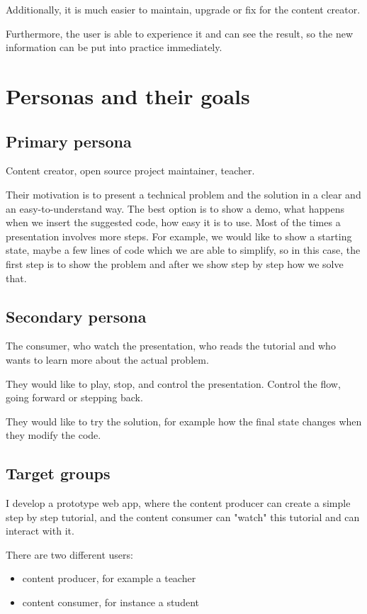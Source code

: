 \documentclass[12pt, a4paper, oneside, openright, medskipamount]{report}
\begin{document}
Additionally, it is much easier to maintain, upgrade or fix for the content creator.

Furthermore, the user is able to experience it and can see the result, so the new information can be put into practice immediately.

\section{Personas and their goals}

\subsection{Primary persona}

Content creator, open source project maintainer, teacher.

Their motivation is to present a technical problem and the solution in a clear and an easy-to-understand way. The best option is to show a demo, what happens when we insert the suggested code, how easy it is to use. Most of the times a presentation involves more steps. For example, we would like to show a starting state, maybe a few lines of code which we are able to simplify, so in this case, the first step is to show the problem and after we show step by step how we solve that.

\subsection{Secondary persona}

The consumer, who watch the presentation, who reads the tutorial and who wants to learn more about the actual problem.

They would like to play, stop, and control the presentation. Control the flow, going forward or stepping back.

They would like to try the solution, for example how the final state changes when they modify the code.

\subsection{Target groups}

I develop a prototype web app, where the content producer can create a simple step by step tutorial, and the content consumer can "watch" this tutorial and can interact with it.

There are two different users:
\begin{itemize}[noitemsep]
\item content producer, for example a teacher
\item content consumer, for instance a student
\end{itemize}
\end{document}
